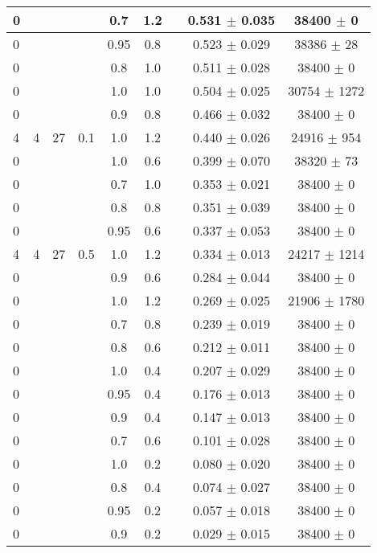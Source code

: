 \begin{table*}[!h]
\begin{center}
\begin{small}
\begin{tabular}{ lcccccccc }
\hline
0 &  &  &  & 0.7 & 1.2 &  &  0.531 $\pm$ 0.035 & 38400 $\pm$ 0  \\
\hline
0 &  &  &  & 0.95 & 0.8 &  &  0.523 $\pm$ 0.029 & 38386 $\pm$ 28  \\
\hline
0 &  &  &  & 0.8 & 1.0 &  &  0.511 $\pm$ 0.028 & 38400 $\pm$ 0  \\
\hline
0 &  &  &  & 1.0 & 1.0 &  &  0.504 $\pm$ 0.025 & 30754 $\pm$ 1272  \\
\hline
0 &  &  &  & 0.9 & 0.8 &  &  0.466 $\pm$ 0.032 & 38400 $\pm$ 0  \\
\hline
4 & 4 & 27 & 0.1 & 1.0 & 1.2 &  &  0.440 $\pm$ 0.026 & 24916 $\pm$ 954  \\
\hline
0 &  &  &  & 1.0 & 0.6 &  &  0.399 $\pm$ 0.070 & 38320 $\pm$ 73  \\
\hline
0 &  &  &  & 0.7 & 1.0 &  &  0.353 $\pm$ 0.021 & 38400 $\pm$ 0  \\
\hline
0 &  &  &  & 0.8 & 0.8 &  &  0.351 $\pm$ 0.039 & 38400 $\pm$ 0  \\
\hline
0 &  &  &  & 0.95 & 0.6 &  &  0.337 $\pm$ 0.053 & 38400 $\pm$ 0  \\
\hline
4 & 4 & 27 & 0.5 & 1.0 & 1.2 &  &  0.334 $\pm$ 0.013 & 24217 $\pm$ 1214  \\
\hline
0 &  &  &  & 0.9 & 0.6 &  &  0.284 $\pm$ 0.044 & 38400 $\pm$ 0  \\
\hline
0 &  &  &  & 1.0 & 1.2 &  &  0.269 $\pm$ 0.025 & 21906 $\pm$ 1780  \\
\hline
0 &  &  &  & 0.7 & 0.8 &  &  0.239 $\pm$ 0.019 & 38400 $\pm$ 0  \\
\hline
0 &  &  &  & 0.8 & 0.6 &  &  0.212 $\pm$ 0.011 & 38400 $\pm$ 0  \\
\hline
0 &  &  &  & 1.0 & 0.4 &  &  0.207 $\pm$ 0.029 & 38400 $\pm$ 0  \\
\hline
0 &  &  &  & 0.95 & 0.4 &  &  0.176 $\pm$ 0.013 & 38400 $\pm$ 0  \\
\hline
0 &  &  &  & 0.9 & 0.4 &  &  0.147 $\pm$ 0.013 & 38400 $\pm$ 0  \\
\hline
0 &  &  &  & 0.7 & 0.6 &  &  0.101 $\pm$ 0.028 & 38400 $\pm$ 0  \\
\hline
0 &  &  &  & 1.0 & 0.2 &  &  0.080 $\pm$ 0.020 & 38400 $\pm$ 0  \\
\hline
0 &  &  &  & 0.8 & 0.4 &  &  0.074 $\pm$ 0.027 & 38400 $\pm$ 0  \\
\hline
0 &  &  &  & 0.95 & 0.2 &  &  0.057 $\pm$ 0.018 & 38400 $\pm$ 0  \\
\hline
0 &  &  &  & 0.9 & 0.2 &  &  0.029 $\pm$ 0.015 & 38400 $\pm$ 0  \\

\end{tabular}
\end{small}
\end{center}
\end{table*}
